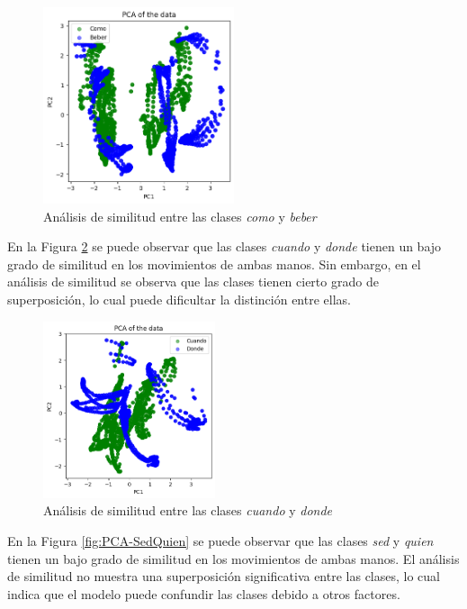 \begin{figure}[H]
    \centering
    \includegraphics[width=0.5\textwidth]{figuras/PCA-ComoBeber.png}
    \caption{Análisis de similitud entre las clases \textit{como} y \textit{beber}}
    \label{fig:PCA-ComoBeber}
\end{figure}

En la Figura \ref{fig:PCA-CuandoDonde} se puede observar que las clases \textit{cuando} y \textit{donde} tienen un bajo grado de similitud en los movimientos de ambas manos.
Sin embargo, en el análisis de similitud se observa que las clases tienen cierto grado de superposición, lo cual puede dificultar la distinción entre ellas.

\begin{figure}[H]
    \centering
    \includegraphics[width=0.45\textwidth]{figuras/PCA-CuandoDonde.png}
    \caption{Análisis de similitud entre las clases \textit{cuando} y \textit{donde}}
    \label{fig:PCA-CuandoDonde}
\end{figure}

En la Figura \ref{fig:PCA-SedQuien} se puede observar que las clases \textit{sed} y \textit{quien} tienen un bajo grado de similitud en los movimientos de ambas manos.
El análisis de similitud no muestra una superposición significativa entre las clases, lo cual indica que el modelo puede confundir las clases debido a otros factores.

